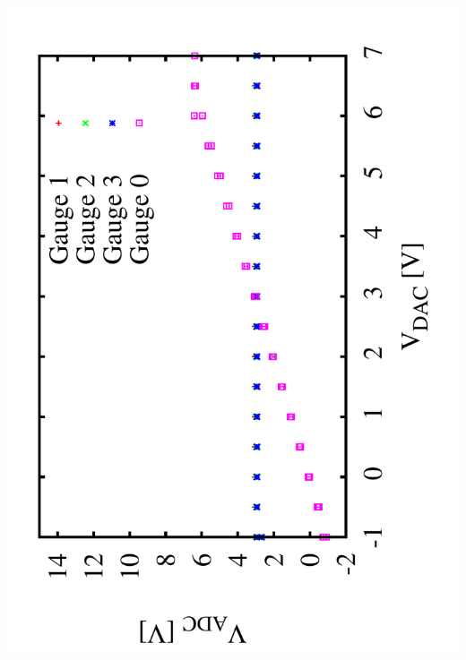 \documentclass[a4paper,11pt]{book}
\begin{document}
  \hspace*{2cm}\includegraphics[angle=-90,scale=0.15]{image_ai_13.pdf}
\end{document}
